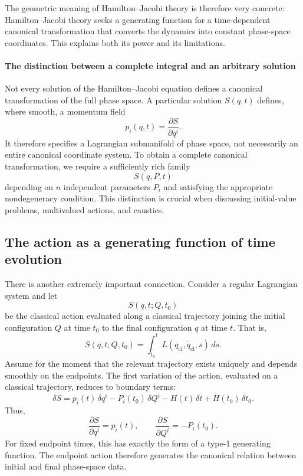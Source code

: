 The geometric meaning of Hamilton–Jacobi theory is therefore very concrete:
Hamilton–Jacobi theory seeks a generating function for a time-dependent
canonical transformation that converts the dynamics into constant phase-space
coordinates. This explains both its power and its limitations.

\paragraph{The distinction between a complete integral and an arbitrary solution}
Not every solution of the Hamilton–Jacobi equation defines a canonical
transformation of the full phase space.
A particular solution \(S(q,t)\) defines, where smooth, a momentum field
\[
p_i(q,t)=\frac{\partial S}{\partial q^i}.
\]
It therefore specifies a Lagrangian submanifold of phase space, not necessarily
an entire canonical coordinate system.
To obtain a complete canonical transformation, we require a sufficiently rich
family
\[
S(q,P,t)
\]
depending on \(n\) independent parameters \(P_i\) and satisfying the
appropriate nondegeneracy condition.
This distinction is crucial when discussing initial-value problems, multivalued
actions, and caustics.

\subsection{The action as a generating function of time evolution}
There is another extremely important connection.
Consider a regular Lagrangian system and let
\[
S(q,t;Q,t_0)
\]
be the classical action evaluated along a classical trajectory joining the
initial configuration \(Q\) at time \(t_0\) to the final configuration \(q\) at
time \(t\).
That is,
\[
S(q,t;Q,t_0)
=
\int_{t_0}^{t}L(q_{\mathrm{cl}},\dot q_{\mathrm{cl}},s)\,ds.
\]
Assume for the moment that the relevant trajectory exists uniquely and depends
smoothly on the endpoints.
The first variation of the action, evaluated on a classical trajectory, reduces
to boundary terms:
\[
\delta S
=p_i(t)\,\delta q^i
-P_i(t_0)\,\delta Q^i
-H(t)\,\delta t
+H(t_0)\,\delta t_0.
\]
Thus,
\[
\boxed{
\frac{\partial S}{\partial q^i}=p_i(t),
\qquad
\frac{\partial S}{\partial Q^i}=-P_i(t_0).
}
\]
For fixed endpoint times, this has exactly the form of a type-1 generating
function.
The endpoint action therefore generates the canonical relation between initial
and final phase-space data.

